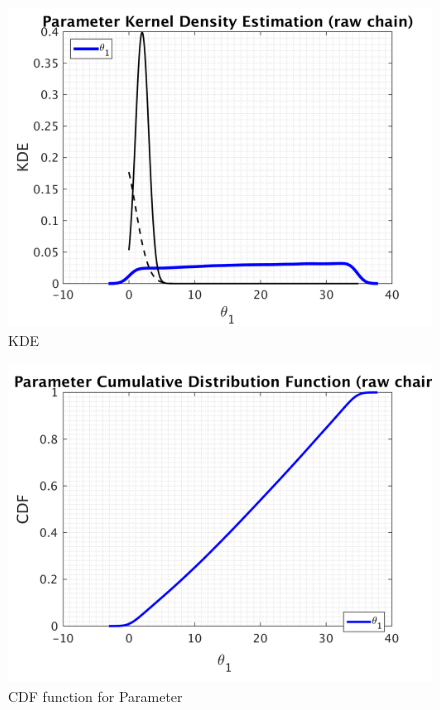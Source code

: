 \begin{figure}[h!]
  
  \centering
   \includegraphics[scale=0.75]{output_50/simple_ip_kde_raw}
   \caption{ KDE }
\end{figure}

\begin{figure}[h!]
  
  \centering
   \includegraphics[scale=0.75]{output_50/simple_ip_cdf_raw}
   \caption{CDF function for Parameter }
\end{figure}



